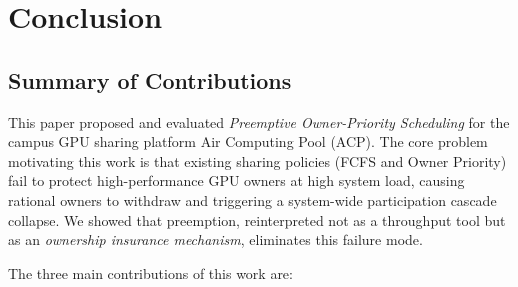 
\section{Conclusion}
\label{sec:conclusion}

%

\subsection{Summary of Contributions}
\label{sec:summary}


This paper proposed and evaluated \emph{Preemptive Owner-Priority Scheduling}
for the campus GPU sharing platform Air Computing Pool (ACP).
The core problem motivating this work is that existing sharing policies
(FCFS and Owner Priority) fail to protect high-performance GPU owners
at high system load, causing rational owners to withdraw and triggering
a system-wide participation cascade collapse.
We showed that preemption, reinterpreted not as a throughput tool
but as an \emph{ownership insurance mechanism}, eliminates this failure mode.


The three main contributions of this work are:


